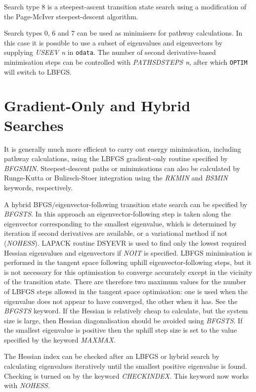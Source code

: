 \documentclass[12pt,a4paper,dvips]{article}
\begin{document}
Search type 8 is a steepest-ascent transition state search using a modification of
the Page-McIver steepest-descent algorithm.

Search types 0, 6 and 7 can be used as minimisers for pathway calculations.
In this case it is possible to use a subset of eigenvalues and eigenvectors
by supplying {\it USEEV n \/} in {\tt odata}.
The number of second derivative-based minimisation steps can be controlled
with {\it PATHSDSTEPS n\/}, after which {\tt OPTIM} will switch to LBFGS.

\section{Gradient-Only and Hybrid Searches}
\label{sec:gradient}
It is generally much more efficient to carry out energy minimisation, including
pathway calculations, using the LBFGS gradient-only routine specified by
{\it BFGSMIN\/}. Steepest-descent
paths or minimisations can also be calculated by Runge-Kutta or Bulirsch-Stoer integration
using the {\it RKMIN\/} and {\it BSMIN\/} keywords, respectively.

A hybrid BFGS/eigenvector-following
transition state search\cite{munrow99,kumedamw01} can be specified by {\it BFGSTS\/}. In this approach
an eigenvector-following step is taken along the eigenvector corresponding to
the smallest eigenvalue, which is determined by iteration if second derivatives are
available, or a variational method if not ({\it NOHESS\/}). 
LAPACK routine { DSYEVR} is used to find only the lowest required Hessian eigenvalues
and eigenvectors if {\it NOIT\/} is specified.
LBFGS minimisation is performed in the tangent space following uphill eigenvector-following
steps, but it is not necessary for
this optimisation to converge accurately except in the vicinity of the transition state.
There are therefore two maximum values for the number of LBFGS steps
allowed in the tangent space optimisation: one is used when the eigenvalue does
not appear to have converged, the other when it has. See the {\it BFGSTS\/} keyword.
If the Hessian is relatively cheap to calculate, but the system size is large, then
Hessian diagonalisation should be avoided using {\it BFGSTS\/}.
If the smallest eigenvalue is positive then the uphill step size is set to the value
specified by the keyword {\it MAXMAX\/}.

The Hessian index can be checked after an LBFGS or hybrid search by calculating 
eigenvalues iteratively until the smallest positive eigenvalue is found. Checking is
turned on by the keyword {\it CHECKINDEX\/}. This keyword now works with {\it NOHESS\/}.
\end{document}
